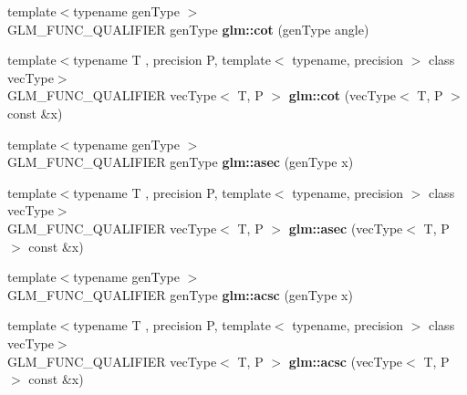\begin{DoxyCompactItemize}
\item 
\hypertarget{namespaceglm_affb4cc5b308512bac40c88faa7204349}{{\footnotesize template$<$typename gen\-Type $>$ }\\G\-L\-M\-\_\-\-F\-U\-N\-C\-\_\-\-Q\-U\-A\-L\-I\-F\-I\-E\-R gen\-Type {\bfseries glm\-::cot} (gen\-Type angle)}\label{namespaceglm_affb4cc5b308512bac40c88faa7204349}

\item 
\hypertarget{namespaceglm_a77c21bbfc00f4c06152bec335e01842b}{{\footnotesize template$<$typename T , precision P, template$<$ typename, precision $>$ class vec\-Type$>$ }\\G\-L\-M\-\_\-\-F\-U\-N\-C\-\_\-\-Q\-U\-A\-L\-I\-F\-I\-E\-R vec\-Type$<$ T, P $>$ {\bfseries glm\-::cot} (vec\-Type$<$ T, P $>$ const \&x)}\label{namespaceglm_a77c21bbfc00f4c06152bec335e01842b}

\item 
\hypertarget{namespaceglm_a315e5fee4f9d52147c9507993d404c0b}{{\footnotesize template$<$typename gen\-Type $>$ }\\G\-L\-M\-\_\-\-F\-U\-N\-C\-\_\-\-Q\-U\-A\-L\-I\-F\-I\-E\-R gen\-Type {\bfseries glm\-::asec} (gen\-Type x)}\label{namespaceglm_a315e5fee4f9d52147c9507993d404c0b}

\item 
\hypertarget{namespaceglm_ad7641a007eb14df8822245d8e13c90bb}{{\footnotesize template$<$typename T , precision P, template$<$ typename, precision $>$ class vec\-Type$>$ }\\G\-L\-M\-\_\-\-F\-U\-N\-C\-\_\-\-Q\-U\-A\-L\-I\-F\-I\-E\-R vec\-Type$<$ T, P $>$ {\bfseries glm\-::asec} (vec\-Type$<$ T, P $>$ const \&x)}\label{namespaceglm_ad7641a007eb14df8822245d8e13c90bb}

\item 
\hypertarget{namespaceglm_a321f32c7c632a6aa72f038269b763f64}{{\footnotesize template$<$typename gen\-Type $>$ }\\G\-L\-M\-\_\-\-F\-U\-N\-C\-\_\-\-Q\-U\-A\-L\-I\-F\-I\-E\-R gen\-Type {\bfseries glm\-::acsc} (gen\-Type x)}\label{namespaceglm_a321f32c7c632a6aa72f038269b763f64}

\item 
\hypertarget{namespaceglm_a2e31d118da987ebe04ad6ca3c366b8d8}{{\footnotesize template$<$typename T , precision P, template$<$ typename, precision $>$ class vec\-Type$>$ }\\G\-L\-M\-\_\-\-F\-U\-N\-C\-\_\-\-Q\-U\-A\-L\-I\-F\-I\-E\-R vec\-Type$<$ T, P $>$ {\bfseries glm\-::acsc} (vec\-Type$<$ T, P $>$ const \&x)}\label{namespaceglm_a2e31d118da987ebe04ad6ca3c366b8d8}


\end{DoxyCompactItemize}
